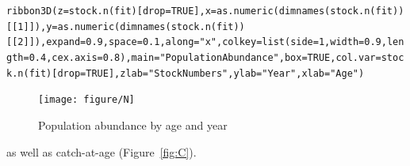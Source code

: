 \documentclass[a4paper,english,10pt]{article}\usepackage[]{graphicx}\usepackage[]{color}
\makeatletter
\newcommand{\hlnum}[1]{\textcolor[rgb]{0.2,0.2,0.2}{#1}}%
\newcommand{\hlstr}[1]{\textcolor[rgb]{0.2,0.2,0.2}{#1}}%
\newcommand{\hlstd}[1]{\textcolor[rgb]{0,0,0}{#1}}%
\newcommand{\hlkwc}[1]{\textcolor[rgb]{0.361,0.506,0.596}{#1}}%
\newcommand{\hlkwd}[1]{\textcolor[rgb]{0.361,0.506,0.596}{#1}}%
\newenvironment{kframe}{%
 \def\at@end@of@kframe{}%
 \ifinner\ifhmode%
  \def\at@end@of@kframe{\end{minipage}}%
  \begin{minipage}{\columnwidth}%
 \fi\fi%
 \def\FrameCommand##1{\hskip\@totalleftmargin \hskip-\fboxsep
 \colorbox{shadecolor}{##1}\hskip-\fboxsep
     \hskip-\linewidth \hskip-\@totalleftmargin \hskip\columnwidth}%
 \MakeFramed {\advance\hsize-\width
   \@totalleftmargin\z@ \linewidth\hsize
   \@setminipage}}%
 {\par\unskip\endMakeFramed%
 \at@end@of@kframe}
\newenvironment{knitrout}{}{} %
\makeatother
\begin{document}
\begin{knitrout}
\color{fgcolor}\begin{kframe}
\begin{alltt}
\hlkwd{ribbon3D}\hlstd{(} \hlkwc{z} \hlstd{=} \hlkwd{stock.n}\hlstd{(fit)[}\hlkwc{drop}\hlstd{=}\hlnum{TRUE}\hlstd{],} \hlkwc{x}\hlstd{=} \hlkwd{as.numeric}\hlstd{(}\hlkwd{dimnames}\hlstd{(}\hlkwd{stock.n}\hlstd{(fit))[[}\hlnum{1}\hlstd{]]),} \hlkwc{y}\hlstd{=} \hlkwd{as.numeric}\hlstd{(}\hlkwd{dimnames}\hlstd{(}\hlkwd{stock.n}\hlstd{(fit))[[}\hlnum{2}\hlstd{]]) ,} \hlkwc{expand} \hlstd{=} \hlnum{0.9}\hlstd{,} \hlkwc{space} \hlstd{=} \hlnum{0.1}\hlstd{,} \hlkwc{along} \hlstd{=} \hlstr{"x"}\hlstd{,} \hlkwc{colkey} \hlstd{=} \hlkwd{list}\hlstd{(} \hlkwc{side}\hlstd{=}\hlnum{1}\hlstd{,} \hlkwc{width} \hlstd{=} \hlnum{0.9}\hlstd{,} \hlkwc{length} \hlstd{=} \hlnum{0.4}\hlstd{,} \hlkwc{cex.axis} \hlstd{=} \hlnum{0.8}\hlstd{),} \hlkwc{main}\hlstd{=}\hlstr{"Population Abundance"} \hlstd{,} \hlkwc{box} \hlstd{=} \hlnum{TRUE}\hlstd{,} \hlkwc{col.var}\hlstd{=}\hlkwd{stock.n}\hlstd{(fit)[}\hlkwc{drop}\hlstd{=}\hlnum{TRUE}\hlstd{],}   \hlkwc{zlab}\hlstd{=}\hlstr{"Stock Numbers"}\hlstd{,} \hlkwc{ylab}\hlstd{=}\hlstr{"Year"}\hlstd{,} \hlkwc{xlab}\hlstd{=}\hlstr{"Age"}\hlstd{)}
\end{alltt}
\end{kframe}\begin{figure}[H]


{\centering \texttt{[image: figure/N]} 

}

\caption[Population abundance by age and year]{Population abundance by age and year\label{fig:N}}
\end{figure}


\end{knitrout}

as well as catch-at-age (Figure~\ref{fig:C}).
\end{document}
